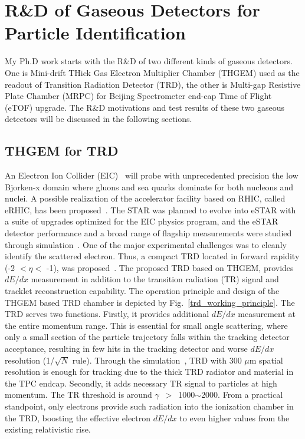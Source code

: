 \chapter{R\&D of Gaseous Detectors for Particle Identification}

My Ph.D work starts with the R\&D of two different kinds of gaseous detectors. One is Mini-drift THick Gas Electron Multiplier Chamber (THGEM) used as the readout of Transition Radiation Detector (TRD), the other is Multi-gap Resistive Plate Chamber (MRPC) for Beijing Spectrometer end-cap Time of Flight (eTOF) upgrade. The R\&D motivations and test results of these two gaseous detectors will be discussed in the following sections.

\section{THGEM for TRD}
An Electron Ion Collider (EIC)~\cite{eic} will probe with unprecedented precision the low Bjorken-x domain where gluons and sea quarks dominate for both nucleons and nuclei. A possible realization of the accelerator facility based on RHIC, called eRHIC, has been proposed~\cite{erhic}. The STAR was planned to evolve into eSTAR with a suite of upgrades optimized for the EIC physics program, and the eSTAR detector performance and a broad range of flagship measurements were studied through simulation~\cite{estarloi}. One of the major experimental challenges was to cleanly identify the scattered electron. Thus, a compact TRD located in forward rapidity (-2 $<\eta<$ -1), was proposed~\cite{startrdproposal}. The proposed TRD based on THGEM, provides $dE/dx$ measurement in addition to the transition radiation (TR) signal and tracklet reconstruction capability. The operation principle and design of the THGEM based TRD chamber is depicted by Fig.~\ref{trd_working_principle}. The TRD serves two functions. Firstly, it provides additional $dE/dx$ measurement at the entire momentum range. This is essential for small angle scattering, where only a small section of the particle trajectory falls within the tracking detector acceptance, resulting in few hits in the tracking detector and worse $dE/dx$ resolution (1/$\sqrt{N}$ rule). Through the simulation~\cite{startrdproposal}, TRD with 300 $\mu$m spatial resolution is enough for tracking due to the thick TRD radiator and material in the TPC endcap. Secondly, it adds necessary TR signal to particles at high momentum. The TR threshold is around $\gamma$~$>$~1000$\sim$2000. From a practical standpoint, only electrons provide such radiation into the ionization chamber in the TRD, boosting the effective electron $dE/dx$ to even higher values from the existing relativistic rise.

